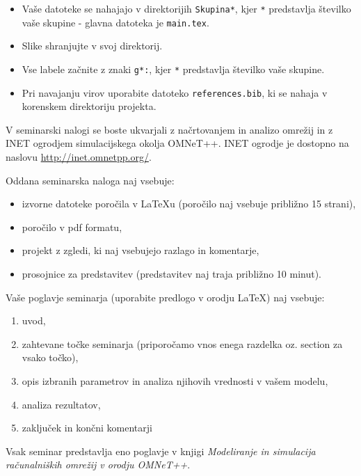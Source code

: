 \begin{itemize}
\item Vaše datoteke se nahajajo v direktorijih \texttt{Skupina*}, kjer \texttt{*} predstavlja številko vaše skupine - glavna datoteka je \texttt{main.tex}.
\item Slike shranjujte v svoj direktorij.
\item Vse labele začnite z znaki \texttt{g*:}, kjer \texttt{*} predstavlja številko vaše skupine.
\item Pri navajanju virov uporabite datoteko \texttt{references.bib}, ki se nahaja v korenskem direktoriju projekta.
\end{itemize}

V seminarski nalogi se boste ukvarjali z načrtovanjem in analizo omrežij in z INET ogrodjem simulacijskega okolja OMNeT++. INET ogrodje je dostopno na naslovu \url{http://inet.omnetpp.org/}.

Oddana seminarska naloga naj vsebuje:

\begin{itemize}
	\item izvorne datoteke poročila v LaTeXu (poročilo naj vsebuje približno 15 strani),
	\item poročilo v pdf formatu,
	\item projekt z zgledi, ki naj vsebujejo razlago in komentarje,
	\item prosojnice za predstavitev (predstavitev naj traja približno 10 minut).
\end{itemize}

Vaše poglavje seminarja (uporabite predlogo v orodju LaTeX) naj vsebuje:

\begin{enumerate}
	\item uvod,
	\item zahtevane točke seminarja (priporočamo vnos enega razdelka oz. section za vsako točko),
	\item opis izbranih parametrov in analiza njihovih vrednosti v vašem modelu,
	\item analiza rezultatov,
	\item zaključek in končni komentarji
\end{enumerate}

Vsak seminar predstavlja eno poglavje v knjigi \textit{Modeliranje in simulacija računalniških omrežij v orodju OMNeT++}. 

